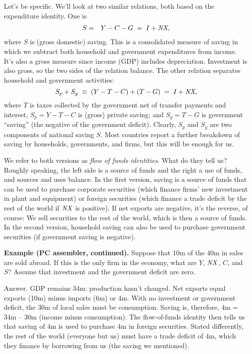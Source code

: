 Let's be specific.
We'll look at two similar relations, both based on the expenditure
identity.
One is
\begin{eqnarray}
           S &=& Y-C-G  \;=\;  I + \mbox{\em NX},
\end{eqnarray}
where $S$ is (gross domestic) saving.
This is a consolidated measure of saving in which we subtract
both household and government expenditures from income.
It's also a gross measure since income (GDP) includes depreciation.
Investment is also gross, so the two sides of the relation balance.
The other relation separates household and government activities:
$$
                         S_p + S_g \;\equiv\; (Y-T-C) + (T-G)
                            \;=\;  I + \mbox{\em NX},
$$
where $T$ is taxes collected by the government net of transfer
payments and interest,
$S_p = Y-T-C$ is (gross) private saving; and
$S_g = T-G$ is government ``saving''
(the negative of the government deficit).
Clearly, $S_p$ and $S_g$ are two components of national saving $S$.
Most countries report a further breakdown of saving by
households, governments, and firms, but this will be enough for us.


We refer to both versions as {\it flow of funds identities\/}.
What do they tell us?
Roughly speaking, the left side is a source of funds and the right a use
of funds, and sources and uses balance.
In the first version, saving is a source of funds that can be used
to purchase corporate securities
(which finance firms' new investment in plant and equipment)
or foreign securities (which finance a trade deficit by the rest of the world
 if $ \mbox{\em NX\/} $ is positive).
If net exports are negative, it's the reverse, of course:
We sell securities to the rest of the world, which is then a source of funds.
In the second version, household saving can also be used to purchase government securities
(if government saving is negative).

\textbf{Example (PC assembler, continued).}
Suppose that 10m of the 40m in sales are sold abroad.
If this is the only firm in the economy, what are $Y$, $\mbox{\em NX\/}$, $C$, and $S$?
Assume that investment and the government deficit are zero.


Answer.  GDP remains 34m:  production hasn't changed.
Net exports equal exports (10m) minus imports (6m) or 4m.
With no investment or government deficit, the 30m of local sales must be consumption.
Saving is, therefore, 4m = 34m -- 30m (income minus consumption).
The flow-of-funds identity then tells us that saving of 4m is used to purchase 4m
in foreign securities. Stated differently, the rest of the world (everyone but us) must have a trade deficit
of 4m, which they finance by borrowing from us (the saving we mentioned).


